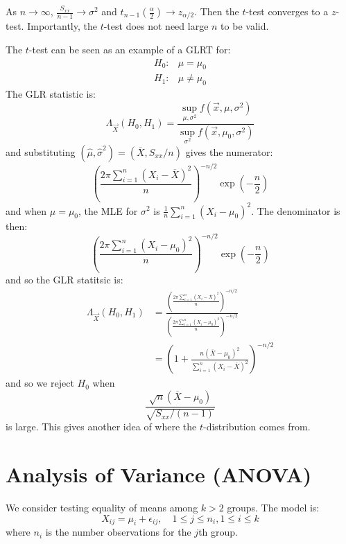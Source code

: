 \documentclass[../Main.tex]{subfiles}
\begin{document}
\begin{remarks}
    \item As $n \to \infty$, $\frac{S_{xx}}{n-1} \to \sigma^2$ and $t_{n-1}\left(\frac{\alpha}{2}\right) \to z_{\alpha / 2}$. Then the $t$-test converges to a $z$-test. Importantly, the $t$-test does not need large $n$ to be valid.
    \item The $t$-test can be seen as an example of a GLRT for:
        \begin{align*}
            H_0:& \mu = \mu_0 \\
            H_1:& \mu \neq \mu_0
        \end{align*}
        The GLR statistic is:
        \begin{equation*}
            \Lambda_{\vec{X}}(H_0, H_1) = \frac{\sup_{\mu, \sigma^2} f(\vec{x}, \mu, \sigma^2)}{\sup_{\sigma^2} f(\vec{x}, \mu_0, \sigma^2)}
        \end{equation*}
        and substituting $(\hat{\mu}, \hat{\sigma}^2) = (\overline{X}, S_{xx} / n)$ gives the numerator:
        \begin{equation*}
            \left(\frac{2\pi\sum_{i=1}^{n} (X_i - \overline{X})^2}{n}\right)^{-n / 2} \exp\left(-\frac{n}{2}\right)
        \end{equation*}
        and when $\mu = \mu_0$, the MLE for $\sigma^2$ is $\frac1n \sum_{i=1}^{n} (X_i - \mu_0)^2$. The denominator is then:
        \begin{equation*}
            \left(\frac{2\pi\sum_{i=1}^{n} (X_i - \mu_0)^2}{n}\right)^{-n / 2} \exp\left(-\frac{n}{2}\right)
        \end{equation*}
        and so the GLR statitsic is:
        \begin{align*}
            \Lambda_{\vec{X}}(H_0, H_1) &= \frac{\left(\frac{2\pi \sum_{i=1}^{n} (X_i - \overline{X})^2}{n}\right)^{-n / 2}}{\left(\frac{2\pi \sum_{i=1}^{n} (X_i - \mu_0)^2}{n}\right)^{-n / 2}} \\
            &= \left(1 + \frac{n(\overline{X} - \mu_0)^2}{\sum_{i=1}^{n} (X_i - \overline{X})^2}\right)^{-n/2}
        \end{align*}
        and so we reject $H_0$ when
        \begin{equation*}
            \frac{\sqrt{n} (\overline{X} - \mu_0)}{\sqrt{S_{xx} / (n-1)}}
        \end{equation*}
        is large. This gives another idea of where the $t$-distribution comes from.
\end{remarks}
\section{Analysis of Variance (ANOVA)}
We consider testing equality of means among $k > 2$ groups. The model is:
\begin{equation*}
    X_{ij} = \mu_i + \epsilon_{ij},\quad 1\leq j \leq n_i, 1 \leq i \leq k
\end{equation*}
where $n_i$ is the number observations for the $j$th group.
\end{document}
